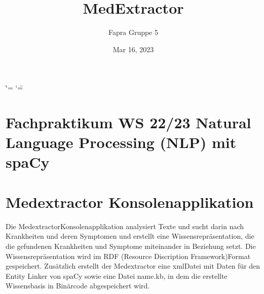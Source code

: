 \documentclass[letterpaper,10pt,english]{sphinxmanual}
\title{MedExtractor}
\date{Mar 16, 2023}
\author{Fapra Gruppe 5}
\begin{document}
\ifdefined\shorthandoff
  \ifnum\catcode`\=\string=\active\shorthandoff{=}\fi
  \ifnum\catcode`\"=\active{}\fi
\fi

\pagestyle{empty}
\sphinxmaketitle
\pagestyle{plain}
\sphinxtableofcontents
\pagestyle{normal}
\label{\detokenize{index::doc}}

\sphinxstepscope


\chapter{Fachpraktikum WS 22/23 \sphinxhyphen{} Natural Language Processing (NLP) mit spaCy}
\label{\detokenize{readme:fachpraktikum-ws-22-23-natural-language-processing-nlp-mit-spacy}}\label{\detokenize{readme::doc}}

\chapter{Medextractor \sphinxhyphen{} Konsolenapplikation}
\label{\detokenize{readme:medextractor-konsolenapplikation}}
\sphinxAtStartPar
Die Medextractor\sphinxhyphen{}Konsolenapplikation analysiert Texte und sucht darin
nach Krankheiten und deren Symptomen und erstellt eine
Wissensrepräsentation, die die gefundenen Krankheiten und Symptome
miteinander in Beziehung setzt. Die Wissensrepräsentation wird im RDF
(Resource Discription Framework)\sphinxhyphen{}Format gespeichert. Zusätzlich erstellt
der Medextractor eine xml\sphinxhyphen{}Datei mit Daten für den Entity Linker von
spaCy sowie eine Datei name.kb, in dem die erstellte Wissensbasis in
Binärcode abgespeichert wird.
\end{document}
